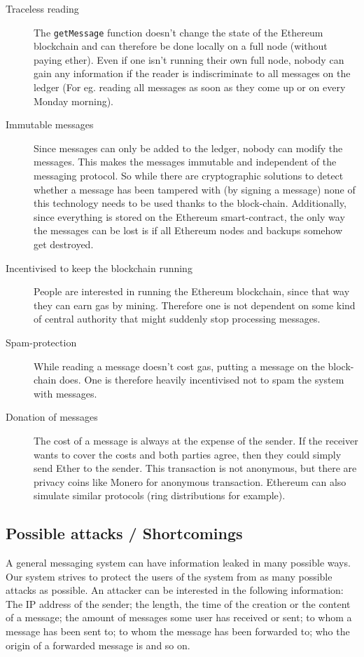 \documentclass[a4paper]{article} %
\begin{document}
\begin{description}

    \item[Traceless reading] The \lstinline{getMessage} function doesn't change the state of the Ethereum blockchain and can therefore be done locally on a full node (without paying ether). Even if one isn't running their own full node, nobody can gain any information if the reader is indiscriminate to all messages on the ledger (For eg. reading all messages as soon as they come up or on every Monday morning).
    
    \item[Immutable messages] Since messages can only be added to the ledger, nobody can modify the messages. This makes the messages immutable and independent of the messaging protocol. So while there are cryptographic solutions to detect whether a message has been tampered with (by signing a message) none of this technology needs to be used thanks to the block-chain. Additionally, since everything is stored on the Ethereum smart-contract, the only way the messages can be lost is if all Ethereum nodes and backups somehow get destroyed.
    
    \item[Incentivised to keep the blockchain running] People are interested in running the Ethereum blockchain, since that way they can earn gas by mining. Therefore one is not dependent on some kind of central authority that might suddenly stop processing messages.
    
    \item[Spam-protection] While reading a message doesn't cost gas, putting a message on the block-chain does. One is therefore heavily incentivised not to spam the system with messages.
    
    \item[Donation of messages] The cost of a message is always at the expense of the sender. If the receiver wants to cover the costs and both parties agree, then they could simply send Ether to the sender. This transaction is not anonymous, but there are privacy coins like Monero for anonymous transaction. Ethereum can also simulate similar protocols (ring distributions for example).
    
\end{description}

\subsection{Possible attacks / Shortcomings}
A general messaging system can have information leaked in many possible ways. Our system strives to protect the users of the system from as many possible attacks as possible.
An attacker can be interested in the following information: The IP address of the sender; the length, the time of the creation or the content of a message; the amount of messages some user has received or sent; to whom a message has been sent to; to whom the message has been forwarded to; who the origin of a forwarded message is and so on.
\end{document}
